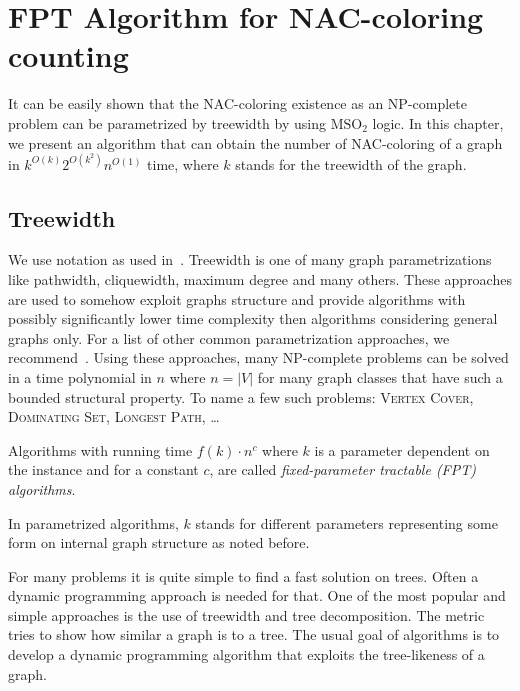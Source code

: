\chapter{FPT Algorithm for NAC-coloring counting}%
\label{chapter:fpt}

\begin{chapterabstract}

	It can be easily shown that the NAC-coloring existence as an NP-complete
	problem can be parametrized by treewidth by using \( \text{MSO}_2 \) logic.
	In this chapter, we present an algorithm that can obtain
	the number of NAC-coloring of a graph in \({k}^{O(k)} 2^{O(k^2)} n^{O(1)}\) time,
	where \(k\) stands for the treewidth of the graph.

\end{chapterabstract}

\section{Treewidth}

We use notation as used in~\cite{book_parametrized_algorithms}.
Treewidth is one of many graph parametrizations like
pathwidth, cliquewidth, maximum degree and many others.
These approaches are used to somehow exploit graphs structure
and provide algorithms with possibly significantly lower time complexity
then algorithms considering general graphs only.
For a list of other common parametrization approaches,
we recommend~\cite{tree_width_comparision_other_classes}.
Using these approaches, many NP-complete problems can be solved
in a time polynomial in \( n \) where \( n = |V| \)
for many graph classes that have such a bounded structural property.
To name a few such problems:
\textsc{Vertex Cover}, \textsc{Dominating Set}, \textsc{Longest Path}, \dots

%
\begin{definition}
	Algorithms with running time \( f(k)\cdot n^c \)
	where \( k \) is a parameter dependent on the instance
	and for a constant \( c \),
	are called \emph{fixed-parameter tractable (FPT) algorithms}.
\end{definition}
%
In parametrized algorithms, \( k \) stands for different parameters
representing some form on internal graph structure as noted before.

For many problems it is quite simple to find a fast solution on trees.
Often a dynamic programming approach is needed for that.
%
One of the most popular and simple approaches
is the use of treewidth and tree decomposition.
The metric tries to show how similar a graph is to a tree.
%
The usual goal of algorithms is to develop a dynamic programming algorithm
that exploits the tree-likeness of a graph.

